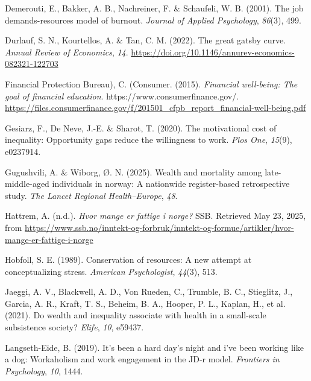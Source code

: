 \documentclass[
  12pt,
  a4paper,
  DIV=11,
  numbers=noendperiod]{scrartcl}
\newlength{\cslhangindent}
\newenvironment{CSLReferences}[2] %
 {\begin{list}{}{%
  \setlength{\itemindent}{0pt}
  \setlength{\leftmargin}{0pt}
  \setlength{\parsep}{0pt}
  \ifodd #1
   \setlength{\leftmargin}{\cslhangindent}
   \setlength{\itemindent}{-1\cslhangindent}
  \fi
  \setlength{\itemsep}{#2\baselineskip}}}
 {\end{list}}
\begin{document}
\label{refs}
\begin{CSLReferences}{1}{0}
Demerouti, E., Bakker, A. B., Nachreiner, F. \& Schaufeli, W. B. (2001).
The job demands-resources model of burnout. \emph{Journal of Applied
Psychology}, \emph{86}(3), 499.

Durlauf, S. N., Kourtellos, A. \& Tan, C. M. (2022). The great gatsby
curve. \emph{Annual Review of Economics}, \emph{14}.
\url{https://doi.org/10.1146/annurev-economics-082321-122703}

Financial Protection Bureau), C. (Consumer. (2015). \emph{Financial
well-being: The goal of financial education}.
https://www.consumerfinance.gov/.
\url{https://files.consumerfinance.gov/f/201501_cfpb_report_financial-well-being.pdf}

Gesiarz, F., De Neve, J.-E. \& Sharot, T. (2020). The motivational cost
of inequality: Opportunity gaps reduce the willingness to work.
\emph{Plos One}, \emph{15}(9), e0237914.

Gugushvili, A. \& Wiborg, Ø. N. (2025). Wealth and mortality among
late-middle-aged individuals in norway: A nationwide register-based
retrospective study. \emph{The Lancet Regional Health--Europe},
\emph{48}.

Hattrem, A. (n.d.). \emph{Hvor mange er fattige i norge?} SSB. Retrieved
May 23, 2025, from
\url{https://www.ssb.no/inntekt-og-forbruk/inntekt-og-formue/artikler/hvor-mange-er-fattige-i-norge}

Hobfoll, S. E. (1989). Conservation of resources: A new attempt at
conceptualizing stress. \emph{American Psychologist}, \emph{44}(3), 513.

Jaeggi, A. V., Blackwell, A. D., Von Rueden, C., Trumble, B. C.,
Stieglitz, J., Garcia, A. R., Kraft, T. S., Beheim, B. A., Hooper, P.
L., Kaplan, H., et al. (2021). Do wealth and inequality associate with
health in a small-scale subsistence society? \emph{Elife}, \emph{10},
e59437.

Langseth-Eide, B. (2019). It's been a hard day's night and i've been
working like a dog: Workaholism and work engagement in the JD-r model.
\emph{Frontiers in Psychology}, \emph{10}, 1444.


\end{CSLReferences}
\end{document}
